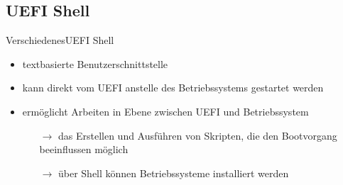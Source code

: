 \documentclass[9pt]{beamer}
\begin{document}
        \subsection{UEFI Shell}
        \begin{frame}{Verschiedenes}{UEFI Shell}
            \begin{itemize}
                \item textbasierte Benutzerschnittstelle
                \item kann direkt vom UEFI anstelle des Betriebssystems gestartet werden
                \item ermöglicht Arbeiten in Ebene zwischen UEFI und Betriebssystem
                \begin{itemize}
                    \item[$\rightarrow$] das Erstellen und Ausführen von Skripten, die den Bootvorgang\\beeinflussen möglich
                    \item[$\rightarrow$] über Shell können Betriebssysteme installiert werden
                \end{itemize}
                
            \end{itemize}
        \end{frame}
\end{document}
